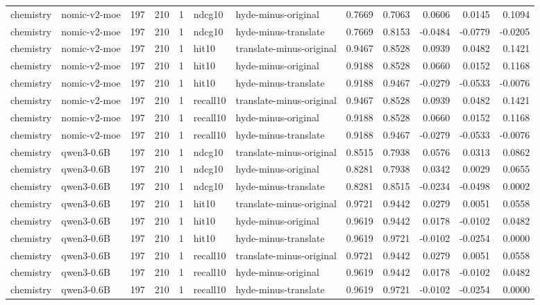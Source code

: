\begin{tabular}{llrrrllrrrrr}
chemistry & nomic-v2-moe & 197 & 210 & 1 & ndcg10 & hyde-minus-original & 0.7669 & 0.7063 & 0.0606 & 0.0145 & 0.1094 \\
chemistry & nomic-v2-moe & 197 & 210 & 1 & ndcg10 & hyde-minus-translate & 0.7669 & 0.8153 & -0.0484 & -0.0779 & -0.0205 \\
chemistry & nomic-v2-moe & 197 & 210 & 1 & hit10 & translate-minus-original & 0.9467 & 0.8528 & 0.0939 & 0.0482 & 0.1421 \\
chemistry & nomic-v2-moe & 197 & 210 & 1 & hit10 & hyde-minus-original & 0.9188 & 0.8528 & 0.0660 & 0.0152 & 0.1168 \\
chemistry & nomic-v2-moe & 197 & 210 & 1 & hit10 & hyde-minus-translate & 0.9188 & 0.9467 & -0.0279 & -0.0533 & -0.0076 \\
chemistry & nomic-v2-moe & 197 & 210 & 1 & recall10 & translate-minus-original & 0.9467 & 0.8528 & 0.0939 & 0.0482 & 0.1421 \\
chemistry & nomic-v2-moe & 197 & 210 & 1 & recall10 & hyde-minus-original & 0.9188 & 0.8528 & 0.0660 & 0.0152 & 0.1168 \\
chemistry & nomic-v2-moe & 197 & 210 & 1 & recall10 & hyde-minus-translate & 0.9188 & 0.9467 & -0.0279 & -0.0533 & -0.0076 \\
chemistry & qwen3-0.6B & 197 & 210 & 1 & ndcg10 & translate-minus-original & 0.8515 & 0.7938 & 0.0576 & 0.0313 & 0.0862 \\
chemistry & qwen3-0.6B & 197 & 210 & 1 & ndcg10 & hyde-minus-original & 0.8281 & 0.7938 & 0.0342 & 0.0029 & 0.0655 \\
chemistry & qwen3-0.6B & 197 & 210 & 1 & ndcg10 & hyde-minus-translate & 0.8281 & 0.8515 & -0.0234 & -0.0498 & 0.0002 \\
chemistry & qwen3-0.6B & 197 & 210 & 1 & hit10 & translate-minus-original & 0.9721 & 0.9442 & 0.0279 & 0.0051 & 0.0558 \\
chemistry & qwen3-0.6B & 197 & 210 & 1 & hit10 & hyde-minus-original & 0.9619 & 0.9442 & 0.0178 & -0.0102 & 0.0482 \\
chemistry & qwen3-0.6B & 197 & 210 & 1 & hit10 & hyde-minus-translate & 0.9619 & 0.9721 & -0.0102 & -0.0254 & 0.0000 \\
chemistry & qwen3-0.6B & 197 & 210 & 1 & recall10 & translate-minus-original & 0.9721 & 0.9442 & 0.0279 & 0.0051 & 0.0558 \\
chemistry & qwen3-0.6B & 197 & 210 & 1 & recall10 & hyde-minus-original & 0.9619 & 0.9442 & 0.0178 & -0.0102 & 0.0482 \\
chemistry & qwen3-0.6B & 197 & 210 & 1 & recall10 & hyde-minus-translate & 0.9619 & 0.9721 & -0.0102 & -0.0254 & 0.0000 \\

\end{tabular}
